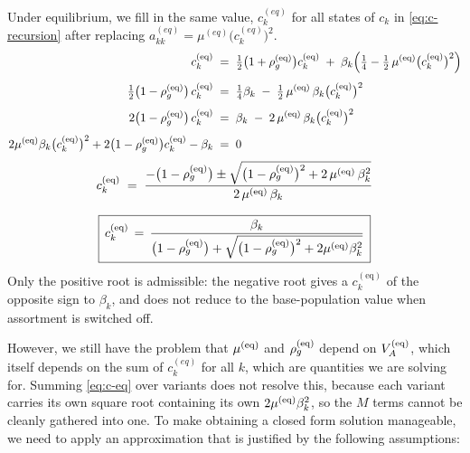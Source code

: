 \documentclass[12pt]{article}
\begin{document}
Under equilibrium, we fill in the same value, $c_k^{(eq)}$ for all states of $c_k$ in \eqref{eq:c-recursion} after replacing $a^{(eq)}_{kk} = \mu^{(eq)}\big(c^{(eq)}_k\big)^2$.
\begin{equation}\label{eq:c-eq-quadratic}
\begin{aligned}
    c^{(\mathrm{eq})}_k \;&=\; \tfrac12\big(1+\rho_g^{(\mathrm{eq})}\big)c^{(\mathrm{eq})}_k
    \;+\; \beta_k\Big(\tfrac14 - \tfrac12\,\mu^{(\mathrm{eq})} \big(c^{(\mathrm{eq})}_k\big)^2\Big) \\[4pt]
    \tfrac12\big(1-\rho_g^{(\mathrm{eq})}\big)\,c^{(\mathrm{eq})}_k \;&=\; \tfrac14\beta_k
    \;-\; \tfrac12\,\mu^{(\mathrm{eq})}\,\beta_k \big(c^{(\mathrm{eq})}_k\big)^2 \\[4pt]
    2\big(1-\rho_g^{(\mathrm{eq})}\big)\,c^{(\mathrm{eq})}_k \;&=\; \beta_k
    \;-\; 2\,\mu^{(\mathrm{eq})}\,\beta_k \big(c^{(\mathrm{eq})}_k\big)^2 \\[4pt]
    2\mu^{(\mathrm{eq})}\beta_k \big(c^{(\mathrm{eq})}_k\big)^2
    + 2\big(1-\rho_g^{(\mathrm{eq})}\big) c^{(\mathrm{eq})}_k - \beta_k \;&=\; 0
\end{aligned}
\end{equation}
\begin{equation}\label{eq:c-eq}
\begin{gathered}
    c^{(\mathrm{eq})}_k \;=\; \frac{-\big(1-\rho_g^{(\mathrm{eq})}\big) \pm \sqrt{\big(1-\rho_g^{(\mathrm{eq})}\big)^2 + 2\,\mu^{(\mathrm{eq})}\,\beta_k^2}}{2\,\mu^{(\mathrm{eq})}\,\beta_k} \\[8pt]
    \boxed{\, c^{(\mathrm{eq})}_k \,=\, \frac{\beta_k}{\big(1-\rho_g^{(\mathrm{eq})}\big) + \sqrt{\big(1-\rho_g^{(\mathrm{eq})}\big)^2 + 2\mu^{(\mathrm{eq})}\beta_k^2}} \,}
\end{gathered}
\end{equation}
Only the positive root is admissible: the negative root gives a $c^{(\mathrm{eq})}_k$ of the opposite sign to $\beta_k$, and does not reduce to the base-population value when assortment is switched off.

However, we still have the problem that $\mu^{(\mathrm{eq})}$ and $\rho_g^{(\mathrm{eq})}$ depend on $V_A^{(\mathrm{eq})}$, which itself depends on the sum of $c^{(eq)}_k$ for all $k$, which are quantities we are solving for.
Summing \eqref{eq:c-eq} over variants does not resolve this, because each variant carries its own square root containing its own $2\mu^{(\mathrm{eq})}\beta_k^2$, so the $M$ terms cannot be cleanly gathered into one.
To make obtaining a closed form solution manageable, we need to apply an approximation that is justified by the following assumptions:
\end{document}
